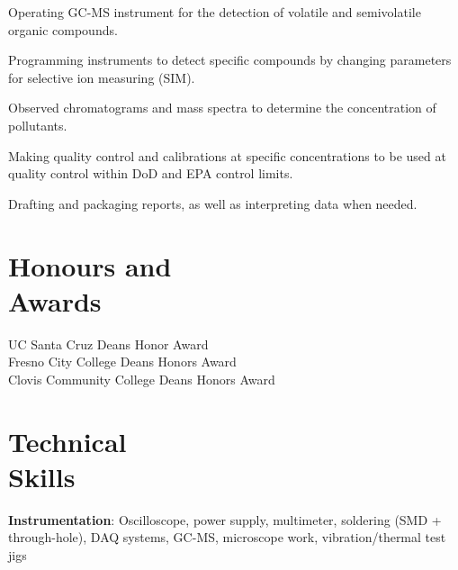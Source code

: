 \documentclass[margin,line]{resume}
\let\origsection\section%
\let\section\subsection%
\let\section\origsection%
\begin{document}
\begin{resume}
\begin{list2}
  \item Operating GC-MS instrument for the detection of volatile and semivolatile organic compounds.
  \item Programming instruments to detect specific compounds by changing parameters for selective ion measuring (SIM).
  \item Observed chromatograms and mass spectra to determine the concentration of pollutants.
  \item Making quality control and calibrations at specific concentrations to be used at quality control within DoD and EPA control limits.
  \item Drafting and packaging reports, as well as interpreting data when needed.
\end{list2}


\section{\mysidestyle Honours and\\Awards}

UC Santa Cruz Deans Honor Award\\
Fresno City College Deans Honors Award\\
Clovis Community College Deans Honors Award\\




\section{\mysidestyle Technical \\Skills}
\textbf{Instrumentation}: Oscilloscope, power supply, multimeter, soldering (SMD + through-hole), DAQ systems, GC-MS, microscope work, vibration/thermal test jigs


\end{resume}
\end{document}
